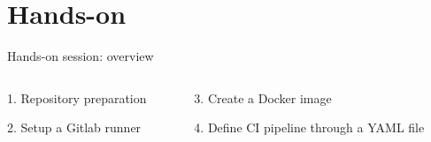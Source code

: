 \section{Hands-on}

\begin{frame}{Hands-on session: overview}
    \begin{columns}
    \begin{column}{0.48\textwidth}
        \begin{exampleblock}{1. Repository preparation}
        \end{exampleblock}
        \begin{block}{2. Setup a Gitlab runner}
        \end{block}
    \end{column}

    \begin{column}{0.48\textwidth}
        \begin{block}{3. Create a Docker image}
        \end{block}
        \begin{block}{4. Define CI pipeline through a YAML file}
        \end{block}
    \end{column}
    \end{columns}
\end{frame}
